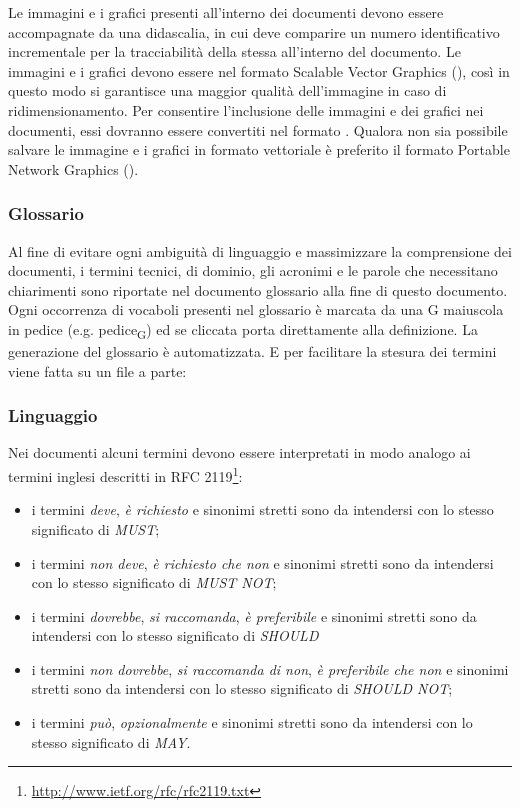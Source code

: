 \documentclass[12pt,a4paper]{article}
\begin{document}
Le immagini e i grafici presenti all'interno dei documenti devono essere accompagnate da una didascalia, in cui deve comparire un numero identificativo incrementale per la tracciabilità della stessa all'interno del documento. Le immagini e i grafici devono essere nel formato Scalable Vector Graphics (), così in questo modo si garantisce una maggior qualità dell'immagine in caso di ridimensionamento. Per consentire l'inclusione delle immagini e dei grafici nei documenti, essi dovranno essere convertiti nel formato  . Qualora non sia possibile salvare le immagine e i grafici in formato vettoriale è preferito il formato Portable Network Graphics ().

\subsubsection{Glossario}
Al fine di evitare ogni ambiguità di linguaggio e massimizzare la comprensione dei documenti, i termini tecnici, di dominio, gli acronimi e le parole che necessitano chiarimenti sono riportate nel documento glossario alla fine di questo documento. Ogni occorrenza di vocaboli presenti nel glossario è marcata da una G maiuscola in pedice (e.g. pedice\textsubscript{G}) ed se cliccata porta direttamente alla definizione. La generazione del glossario è automatizzata. E per facilitare la stesura dei termini viene fatta su un file a parte:
\begin{center}
\end{center}


\subsubsection{Linguaggio}
Nei documenti alcuni termini devono essere interpretati in modo analogo ai termini inglesi descritti in RFC 2119\footnote{\url{http://www.ietf.org/rfc/rfc2119.txt}}:
\begin{itemize}
	\item i termini \emph{deve}, \emph{è richiesto} e sinonimi stretti sono da intendersi con lo stesso significato di \emph{MUST};
	\item i termini \emph{non deve}, \emph{è richiesto che non} e sinonimi stretti sono da intendersi con lo stesso significato di \emph{MUST NOT};
	\item i  termini \emph{dovrebbe}, \emph{si raccomanda}, \emph{è preferibile} e sinonimi stretti sono da intendersi con lo stesso significato di \emph{SHOULD}
	\item i termini \emph{non dovrebbe}, \emph{si raccomanda di non}, \emph{è preferibile che non} e sinonimi stretti sono da intendersi con lo stesso significato di \emph{SHOULD NOT};
	\item i termini \emph{può}, \emph{opzionalmente} e sinonimi stretti sono da intendersi con lo stesso significato di \emph{MAY}.
\end{itemize}
\end{document}
